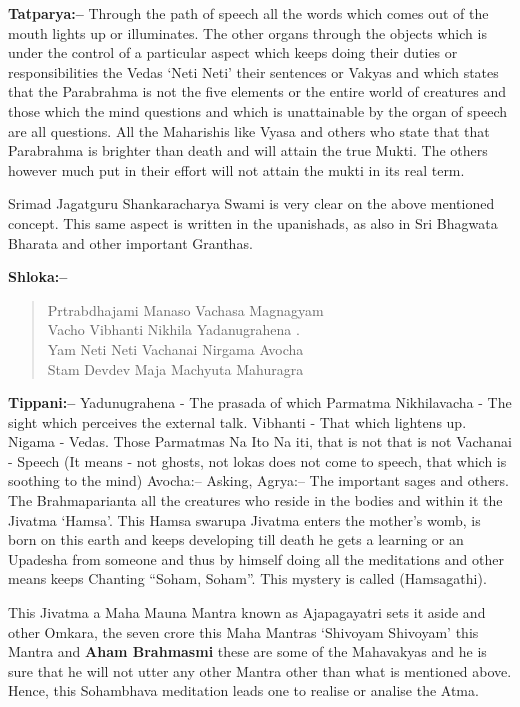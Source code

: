 \textbf{Tatparya:–} Through the path of speech all the words which comes out of the mouth lights up or illuminates. The other organs through the objects which is under the control of a particular aspect which keeps doing their duties or responsibilities the Vedas ‘Neti Neti’ their sentences or Vakyas and which states that the Parabrahma is not the five elements or the entire world of creatures and those which the mind questions and which is unattainable by the organ of speech are all questions. All the Maharishis like Vyasa and others who state that that Parabrahma is brighter than death and will attain the true Mukti. The others however much put in their effort will not attain the mukti in its real term.

Srimad Jagatguru Shankaracharya Swami is very clear on the above mentioned concept. This same aspect is written in the upanishads, as also in Sri Bhagwata Bharata and other important Granthas.

\textbf{Shloka:–}

\begin{verse}
 Prtrabdhajami Manaso Vachasa Magnagyam \\
 Vacho Vibhanti Nikhila Yadanugrahena .\\
 Yam Neti Neti Vachanai Nirgama Avocha \\
 Stam Devdev Maja Machyuta Mahuragra 
\end{verse}

\textbf{Tippani:–} Yadunugrahena - The prasada of which Parmatma Nikhila\break vacha - The sight which perceives the external talk. Vibhanti - That which lightens up. Nigama - Vedas. Those Parmatmas Na Ito Na iti, that is not that is not Vachanai - Speech (It means - not ghosts, not lokas does not come to speech, that which is soothing to the mind) Avocha:– Asking, Agrya:– The important sages and others. The Brahmaparianta all the creatures who reside in the bodies and within it the Jivatma ‘Hamsa’. This Hamsa swarupa Jivatma enters the mother's womb, is born on this earth and keeps developing till death he gets a learning or an Upadesha from someone and thus by himself doing all the meditations and other means keeps Chanting “Soham, Soham”. This mystery is called (Hamsagathi).

This Jivatma a Maha Mauna Mantra known as Ajapagayatri sets it aside and other Omkara, the seven crore this Maha Mantras ‘Shivoyam Shivoyam’ this Mantra and \textbf{Aham Brahmasmi} these are some of the Mahavakyas and he is sure that he will not utter any other Mantra other than what is mentioned above. Hence, this Sohambhava meditation leads one to realise or analise the Atma.

